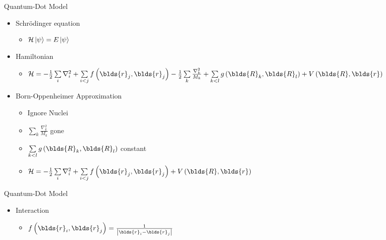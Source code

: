 \documentclass[10pt, t]{beamer}
\begin{document}
\begin{frame}[fragile]{Quantum-Dot Model}
    \begin{itemize}
        \item Schrödinger equation 
            \begin{itemize}
                \item $\mathcal{H}\ket{\psi} = E\ket{\psi}$
            \end{itemize}
        \item Hamiltonian
            \begin{itemize}
                \item $\mathcal{H} = - \frac{1}{2} \sum\limits_i \nabla^2_i +
                    \sum\limits_{i<j} f\left(\blds{r}_j, \blds{r}_j\right) -
                    \frac{1}{2} \sum\limits_k \frac{\nabla^2_k}{M_k} + \sum\limits_{k<l}
                    g\left(\blds{R}_k,\blds{R}_l\right) +
                    V\left(\blds{R},\blds{r}\right)$
            \end{itemize}
        \item Born-Oppenheimer Approximation
            \begin{itemize}
                \item Ignore Nuclei
                \item $\sum\limits_k \frac{\nabla^2_k}{M_k}$ gone
                \item $\sum\limits_{k<l} g\left(\blds{R}_k,\blds{R}_l\right)$ constant
                \item $\mathcal{H} = - \frac{1}{2} \sum\limits_i \nabla^2_i +
                    \sum\limits_{i<j} f\left(\blds{r}_j, \blds{r}_j\right) +
                    V\left(\blds{R},\blds{r}\right)$
            \end{itemize}
    \end{itemize}
\end{frame}

\begin{frame}[fragile]{Quantum-Dot Model}
    \begin{itemize}
        \item Interaction
            \begin{itemize}
                \item $f\left(\blds{r}_i, \blds{r}_j\right) =
                    \frac{1}{\abs{\blds{r}_i - \blds{r}_j}}$
            \end{itemize}
    \end{itemize}
\end{frame}
\end{document}
